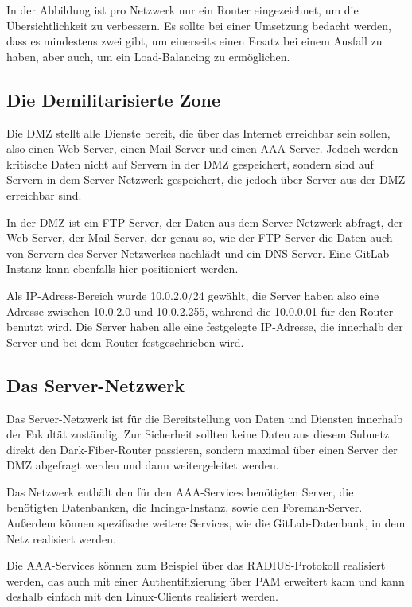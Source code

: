 In der Abbildung ist pro Netzwerk nur ein Router eingezeichnet, um die Übersichtlichkeit zu verbessern. Es sollte bei einer Umsetzung bedacht werden, dass es mindestens zwei gibt, um einerseits einen Ersatz bei einem Ausfall zu haben, aber auch, um  ein Load-Balancing zu ermöglichen.

\subsection{Die Demilitarisierte Zone}
Die DMZ stellt alle Dienste bereit, die über das Internet erreichbar sein sollen, also einen Web-Server, einen Mail-Server und einen AAA-Server. Jedoch werden kritische Daten nicht auf Servern in der DMZ gespeichert, sondern sind auf Servern in dem Server-Netzwerk gespeichert, die jedoch über Server aus der DMZ erreichbar sind.

In der DMZ ist ein FTP-Server, der Daten aus dem Server-Netzwerk abfragt, der Web-Server, der Mail-Server, der genau so, wie der FTP-Server die Daten auch von Servern des Server-Netzwerkes nachlädt und ein DNS-Server. Eine GitLab-Instanz kann ebenfalls hier positioniert werden.

Als IP-Adress-Bereich wurde 10.0.2.0/24 gewählt, die Server haben also eine Adresse zwischen 10.0.2.0 und 10.0.2.255, während die 10.0.0.01 für den Router benutzt wird. Die Server haben alle eine festgelegte IP-Adresse, die innerhalb der Server und bei dem Router festgeschrieben wird.


\subsection{Das Server-Netzwerk}
Das Server-Netzwerk ist für die Bereitstellung von Daten und Diensten innerhalb der Fakultät zuständig. Zur Sicherheit sollten keine Daten aus diesem Subnetz direkt den Dark-Fiber-Router passieren, sondern maximal über einen Server der DMZ abgefragt werden und dann weitergeleitet werden.

Das Netzwerk enthält den für den AAA-Services benötigten Server, die benötigten Datenbanken, die Incinga-Instanz, sowie den Foreman-Server. Außerdem können spezifische weitere Services, wie die GitLab-Datenbank, in dem Netz realisiert werden.

Die AAA-Services können zum Beispiel über das RADIUS-Protokoll realisiert werden, das auch mit einer Authentifizierung über PAM erweitert kann und kann deshalb einfach mit den Linux-Clients realisiert werden.

